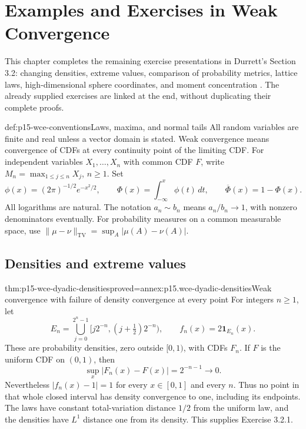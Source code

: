 \chapter{Examples and Exercises in Weak Convergence}
\label{sec:p15-weak-convergence-exercises}

This chapter completes the remaining exercise presentations in
Durrett's Section 3.2: changing densities, extreme values,
comparison of probability metrics, lattice laws, high-dimensional
sphere coordinates, and moment concentration
\cite[Exercises~3.2.1--3.2.17, pp.~123--125]{DurrettPTEAuthor2019}.
The already supplied exercises are linked at the end, without
duplicating their complete proofs.

\begin{hbdefinition}{def:p15-wce-conventions}{Laws, maxima, and normal tails}
All random variables are finite and real unless a vector domain
is stated. Weak convergence means convergence of CDFs at every
continuity point of the limiting CDF.
For independent variables \(X_1,\ldots,X_n\) with common CDF \(F\),
write \(M_n=\max_{1\leq j\leq n}X_j\), \(n\geq1\).
Set
\[
 \phi(x)=(2\pi)^{-1/2}e^{-x^2/2},\qquad
 \Phi(x)=\int_{-\infty}^x\phi(t)\,dt,\qquad
 \overline\Phi(x)=1-\Phi(x).
 \]
All logarithms are natural. The notation \(a_n\sim b_n\)
means \(a_n/b_n\to1\), with nonzero denominators eventually.
For probability measures on a common measurable space, use
\(\|\mu-\nu\|_{\mathrm{TV}}=\sup_A|\mu(A)-\nu(A)|\).
\end{hbdefinition}

\section{Densities and extreme values}
\label{sec:p15-wce-density-extremes}

\begin{hbtheorem}{thm:p15-wce-dyadic-densities}{proved=annex:p15.wce-dyadic-densities}{Weak convergence with failure of density convergence at every point}
For integers \(n\geq1\), let
\[
 E_n=\bigcup_{j=0}^{2^n-1}
       [j2^{-n},(j+\tfrac12)2^{-n}),\qquad
 f_n(x)=2\mathbf1_{E_n}(x).
 \]
These are probability densities, zero outside \([0,1)\),
with CDFs \(F_n\). If \(F\) is the uniform CDF on \((0,1)\),
then
\[
 \sup_x|F_n(x)-F(x)|=2^{-n-1}\longrightarrow0.
 \]
Nevertheless \(|f_n(x)-1|=1\) for every \(x\in[0,1]\)
and every \(n\). Thus no point in that whole closed interval
has density convergence to one, including its endpoints.
The laws have constant total-variation distance \(1/2\) from
the uniform law, and the densities have \(L^1\) distance one
from its density. This supplies Exercise 3.2.1.
\end{hbtheorem}

